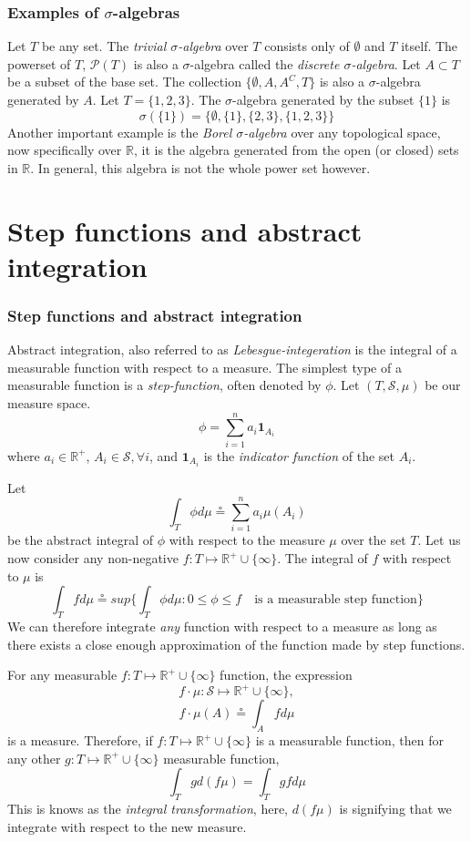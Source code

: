 \documentclass[xcolor=dvipsnames]{beamer}
\begin{document}
\begin{frame}
\frametitle{Examples of $\sigma$-algebras}
Let $T$ be any set. The \emph{trivial $\sigma$-algebra} over $T$ consists only of $\emptyset$ and $T$ itself. The powerset of $T$, $\mathcal{P}(T)$ is also a $\sigma$-algebra called the \emph{discrete $\sigma$-algebra}. Let $A \subset T$ be a subset of the base set. The collection $\{\emptyset, A, A^C, T\}$ is also a $\sigma$-algebra generated by $A$. Let $T = \{1, 2, 3\}$. The $\sigma$-algebra generated by the subset $\{1\}$ is
\[
	\sigma(\{1\}) = \{\emptyset, \{1\}, \{2, 3\}, \{1, 2, 3\}\}
\]
Another important example is the \emph{Borel $\sigma$-algebra} over any topological space, now specifically over $\mathbb{R}$, it is the algebra generated from the open (or closed) sets in $\mathbb{R}$. In general, this algebra is not the whole power set however.
\end{frame}
\section{Step functions and abstract integration}
\begin{frame}
\frametitle{Step functions and abstract integration}
Abstract integration, also referred to as \emph{Lebesgue-integeration} is the integral of a measurable function with respect to a measure. The simplest type of a measurable function is a \emph{step-function}, often denoted by $\phi$. Let $(T, \mathcal{S}, \mu)$ be our measure space.
\[
	\phi = \sum_{i=1}^{n}{a_i\pmb{1}_{A_i}}
\]
where $a_i \in \mathbb{R}^{+}$, $A_i \in \mathcal{S}, \forall i$, and $\pmb{1}_{A_i}$ is the \emph{indicator function} of the set $A_i$.
\end{frame}
\begin{frame}
Let
\[
	\int_{T}{\phi d\mu} \circeq \sum_{i=1}^{n}{a_i \mu(A_i)}
\]
be the abstract integral of $\phi$ with respect to the measure $\mu$ over the set $T$. Let us now consider any non-negative $f : T \mapsto \mathbb{R}^{+} \cup \{\infty\}$. The integral of $f$ with respect to $\mu$ is
\[
	\int_{T}{f d\mu} \circeq sup\Bigg\{\int_{T}{\phi d\mu} : 0 \le \phi \le f \quad \text{is a measurable step function}\Bigg\}
\]
We can therefore integrate \emph{any} function with respect to a measure as long as there exists a close enough approximation of the function made by step functions.
\end{frame}
\begin{frame}
For any measurable $f : T \mapsto \mathbb{R}^{+} \cup \{\infty\}$ function, the expression
\[
	f \cdot \mu : \mathcal{S} \mapsto \mathbb{R}^{+} \cup \{\infty\},
\]
\[
	f \cdot \mu (A) \circeq \int_A{f d\mu}
\]
is a measure.
Therefore, if $f : T \mapsto \mathbb{R}^{+} \cup \{\infty\}$ is a measurable function, then for any other $g : T \mapsto \mathbb{R}^{+} \cup \{\infty\}$ measurable function, 
\[
	\int_T{g d(f\mu)} = \int_T{g f d\mu}
\]
This is knows as the \emph{integral transformation}, here, $d(f\mu)$ is signifying that we integrate with respect to the new measure.
\end{frame}
\end{document}
